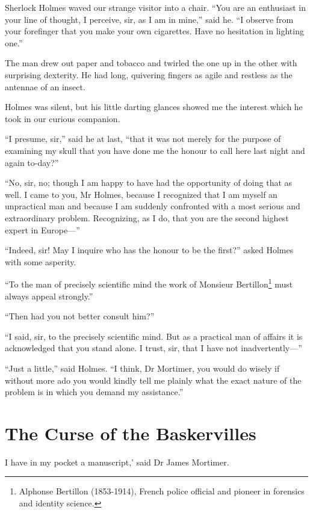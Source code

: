 \documentclass[paper=5.5in:8.5in,BCOR=7mm,twoside,DIV=calc,12pt,usegeometry,openany,chapterprefix,endperiod]{scrbook} %
\begin{document}
Sherlock Holmes waved our strange visitor into a chair. \enquote{You are an enthusiast in your line of thought, I perceive, sir, as I am in mine,} said he. \enquote{I observe from your forefinger that you make your own cigarettes. Have no hesitation in lighting one.}

The man drew out paper and tobacco and twirled the one up in the other with surprising dexterity. He had long, quivering fingers as agile and restless as the antennae of an insect.

Holmes was silent, but his little darting glances showed me the interest which he took in our curious companion.

\enquote{I presume, sir,} said he at last, \enquote{that it was not merely for the purpose of examining my skull that you have done me the honour to call here last night and again to-day?}

\enquote{No, sir, no; though I am happy to have had the opportunity of doing that as well. I came to you, Mr Holmes, because I recognized that I am myself an unpractical man and because I am suddenly confronted with a most serious and extraordinary problem. Recognizing, as I do, that you are the second highest expert in Europe\nobreakdash---}

\enquote{Indeed, sir! May I inquire who has the honour to be the first?} asked Holmes with some asperity.

\enquote{To the man of precisely scientific mind the work of Monsieur Bertillon\footnote{Alphonse Bertillon (1853-1914), French police official and pioneer in forensics and identity science.} must always appeal strongly.}

\enquote{Then had you not better consult him?}

\enquote{I said, sir, to the precisely scientific mind. But as a practical man of affairs it is acknowledged that you stand alone. I trust, sir, that I have not inadvertently\nobreakdash---}

\enquote{Just a little,} said Holmes. \enquote{I think, Dr Mortimer, you would do wisely if without more ado you would kindly tell me plainly what the exact nature of the problem is in which you demand my assistance.}

\chapter{The Curse of the Baskervilles}
\lettrine[ante=`,lines=1]{I}{} have in my pocket a manuscript,' said Dr James Mortimer.
\end{document}
